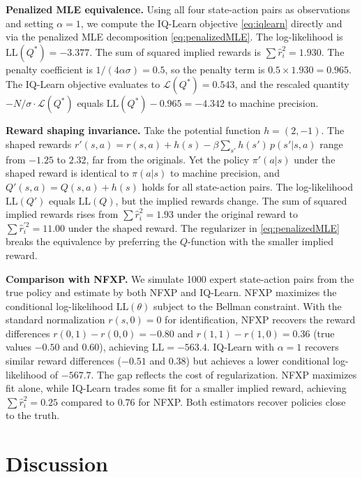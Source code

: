 \documentclass[11pt]{article}
\begin{document}
\noindent\textbf{Penalized MLE equivalence.} Using all four state-action pairs as observations and setting $\alpha = 1$, we compute the IQ-Learn objective \eqref{eq:iqlearn} directly and via the penalized MLE decomposition \eqref{eq:penalizedMLE}. The log-likelihood is $\mathrm{LL}(Q^*) = -3.377$. The sum of squared implied rewards is $\sum \hat{r}_i^2 = 1.930$. The penalty coefficient is $1/(4\alpha\sigma) = 0.5$, so the penalty term is $0.5 \times 1.930 = 0.965$. The IQ-Learn objective evaluates to $\mathcal{L}(Q^*) = 0.543$, and the rescaled quantity $-N/\sigma \cdot \mathcal{L}(Q^*)$ equals $\mathrm{LL}(Q^*) - 0.965 = -4.342$ to machine precision.

\noindent\textbf{Reward shaping invariance.} Take the potential function $h = (2, -1)$. The shaped rewards $r'(s,a) = r(s,a) + h(s) - \beta\sum_{s'}h(s')\,p(s'|s,a)$ range from $-1.25$ to $2.32$, far from the originals. Yet the policy $\pi'(a|s)$ under the shaped reward is identical to $\pi(a|s)$ to machine precision, and $Q'(s,a) = Q(s,a) + h(s)$ holds for all state-action pairs. The log-likelihood $\mathrm{LL}(Q')$ equals $\mathrm{LL}(Q)$, but the implied rewards change. The sum of squared implied rewards rises from $\sum\hat{r}_i^2 = 1.93$ under the original reward to $\sum\hat{r}_i^{\prime 2} = 11.00$ under the shaped reward. The regularizer in \eqref{eq:penalizedMLE} breaks the equivalence by preferring the $Q$-function with the smaller implied reward.

\noindent\textbf{Comparison with NFXP.} We simulate 1000 expert state-action pairs from the true policy and estimate by both NFXP and IQ-Learn. NFXP maximizes the conditional log-likelihood $\mathrm{LL}(\theta)$ subject to the Bellman constraint. With the standard normalization $r(s,0) = 0$ for identification, NFXP recovers the reward differences $r(0,1) - r(0,0) = -0.80$ and $r(1,1) - r(1,0) = 0.36$ (true values $-0.50$ and $0.60$), achieving $\mathrm{LL} = -563.4$. IQ-Learn with $\alpha = 1$ recovers similar reward differences ($-0.51$ and $0.38$) but achieves a lower conditional log-likelihood of $-567.7$. The gap reflects the cost of regularization. NFXP maximizes fit alone, while IQ-Learn trades some fit for a smaller implied reward, achieving $\sum\hat{r}_i^2 = 0.25$ compared to $0.76$ for NFXP. Both estimators recover policies close to the truth.

\section{Discussion}
\end{document}
